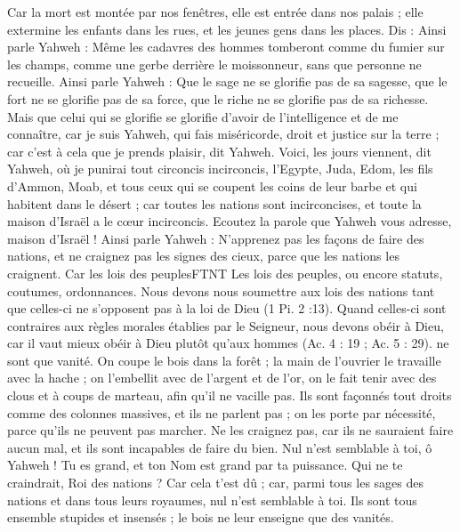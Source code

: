 \begin{multicols}{2}
Car la mort est montée par nos fenêtres, elle est entrée dans nos palais ; elle extermine les enfants dans les rues, et les jeunes gens dans les places.
Dis : Ainsi parle Yahweh : Même les cadavres des hommes tomberont comme du fumier sur les champs, comme une gerbe derrière le moissonneur, sans que personne ne recueille.
Ainsi parle Yahweh : Que le sage ne se glorifie pas de sa sagesse, que le fort ne se glorifie pas de sa force, que le riche ne se glorifie pas de sa richesse.
Mais que celui qui se glorifie se glorifie d’avoir de l'intelligence et de me connaître, car je suis Yahweh, qui fais miséricorde, droit et justice sur la terre ; car c’est à cela que je prends plaisir, dit Yahweh.
Voici, les jours viennent, dit Yahweh, où je punirai tout circoncis incirconcis,
l'Egypte, Juda, Edom, les fils d’Ammon, Moab, et tous ceux qui se coupent les coins de leur barbe et qui habitent dans le désert ; car toutes les nations sont incirconcises, et toute la maison d'Israël a le cœur incirconcis.
\VerseOne{}Ecoutez la parole que Yahweh vous adresse, maison d'Israël !
Ainsi parle Yahweh : N'apprenez pas les façons de faire des nations, et ne craignez pas les signes des cieux, parce que les nations les craignent.
Car les lois des peuplesFTNT{ Les lois  des peuples, ou encore statuts, coutumes, ordonnances. Nous devons nous soumettre aux lois des nations tant que celles-ci ne s’opposent pas à la loi de Dieu (1 Pi. 2 :13). Quand celles-ci sont contraires aux règles morales établies par le Seigneur, nous devons obéir à Dieu, car il vaut mieux obéir à Dieu plutôt qu’aux hommes (Ac. 4 : 19 ; Ac. 5 : 29).} ne sont que vanité. On coupe le bois dans la forêt ; la main de l’ouvrier le travaille avec la hache ;
on l'embellit avec de l'argent et de l'or, on le fait tenir avec des clous et à coups de marteau, afin qu'il ne vacille pas.
Ils sont façonnés tout droits comme des colonnes massives, et ils ne parlent pas ; on les porte par nécessité, parce qu’ils ne peuvent pas marcher. Ne les craignez pas, car ils ne sauraient faire aucun mal, et ils sont incapables de faire du bien.
Nul n’est semblable à toi, ô Yahweh ! Tu es grand, et ton Nom est grand par ta puissance.
Qui ne te craindrait, Roi des nations ? Car cela t’est dû ; car, parmi tous les sages des nations et dans tous leurs royaumes, nul n’est semblable à toi.
Ils sont tous ensemble stupides et insensés ; le bois ne leur enseigne que des vanités.

\end{multicols}

